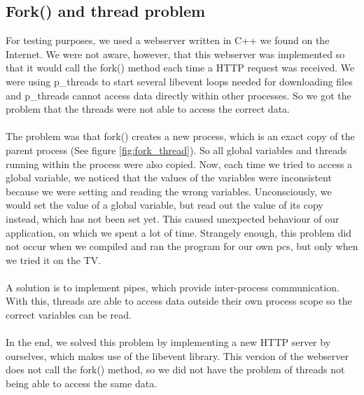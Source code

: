 \subsection{Fork() and thread problem}
For testing purposes, we used a webserver written in C++ we found on the Internet. We were 
not aware, however, that this webserver was implemented so that it would call the fork() 
method each time a HTTP request was received. We were using p\_threads\cite{thread} to start several libevent\cite{libevent} loops needed for downloading files and p\_threads cannot access data directly within other processes. So we got the problem that the threads were not able to access the correct data.
\\\\
The problem was that fork() creates a new process, which is an exact copy of the parent 
process (See figure \ref{fig:fork_thread}). So all global variables and threads running 
within the process were also copied. Now, each time we tried to access a global variable, we 
noticed that the values of the variables were inconsistent because we were setting and 
reading the wrong variables. Unconsciously, we would set the value of a global variable, but 
read out the value of its copy instead, which has not been set yet. This caused unexpected 
behaviour of our application, on which we spent a lot of time. Strangely enough, this problem 
did not occur when we compiled and ran the program for our own pc\textquotesingle s, but only when we tried it on the TV.
\\\\
A solution is to implement pipes, which provide inter-process communication. With this, threads are able to access data outside their own process scope so the correct variables can be read. 
\\\\
In the end, we solved this problem by implementing a new HTTP server by ourselves, which makes use of the libevent library. This version of the webserver does not call the fork() method, so we did not have the problem of threads not being able to access the same data.

